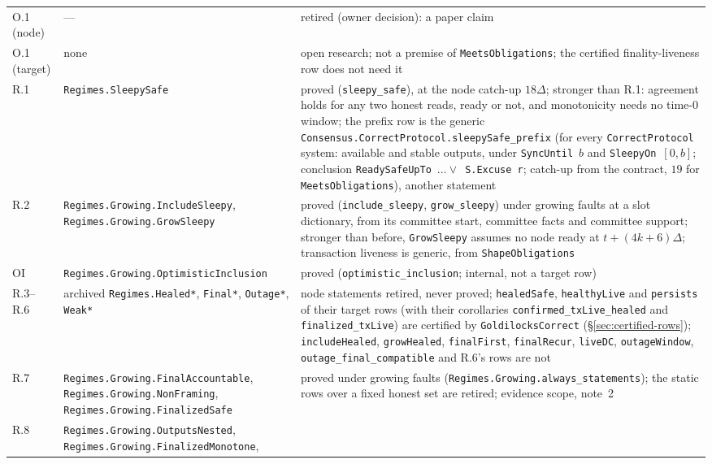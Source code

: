 \documentclass{article}
\begin{document}
{\begin{longtable}{@{}>{\raggedright\arraybackslash}p{1.6cm}>{\raggedright\arraybackslash}p{6.2cm}>{\raggedright\arraybackslash}p{5.2cm}@{}}
O.1 (node) & --- & retired (owner decision): a paper claim\\
O.1 (target) & none & open research; not a premise of \texttt{MeetsObligations};
  the certified finality-liveness row does not need it\\
R.1 & \texttt{Regimes.SleepySafe} & proved (\texttt{sleepy\_safe}), at
  the node catch-up $18\Delta$; stronger than R.1: agreement holds for any
  two honest reads, ready or not, and monotonicity needs no time-$0$ window; the prefix row is the generic
  \texttt{Consensus.CorrectProtocol.\allowbreak sleepySafe\_prefix} (for every \texttt{CorrectProtocol}
  system: available and stable outputs, under \texttt{SyncUntil}~$b$ and
  \texttt{SleepyOn}~$[0,b]$; conclusion
  \texttt{ReadySafeUpTo}~$\ldots\lor$~\texttt{S.Excuse r}; catch-up from the
  contract, $19$ for \texttt{MeetsObligations}),
  another statement\\
R.2 & \texttt{Regimes.Growing.IncludeSleepy}, \texttt{Regimes.Growing.GrowSleepy} & proved
  (\texttt{include\_sleepy}, \texttt{grow\_sleepy}) under growing faults at a slot
  dictionary, from its committee start, committee facts and committee support; stronger than before,
  \texttt{GrowSleepy} assumes no node ready at $t+(4k+6)\Delta$; transaction
  liveness is generic, from
  \texttt{ShapeObligations}\\
OI & \texttt{Regimes.Growing.OptimisticInclusion} & proved
  (\texttt{optimistic\_inclusion}; internal, not a target row)\\
R.3--R.6 & archived \texttt{Regimes.Healed*}, \texttt{Final*},
  \texttt{Outage*}, \texttt{Weak*} & node statements retired, never
  proved; \texttt{healedSafe}, \texttt{healthyLive} and \texttt{persists}
  of their target rows (with their corollaries \texttt{confirmed\_txLive\_healed}
  and \texttt{finalized\_txLive}) are certified by \texttt{GoldilocksCorrect}
  (\S\ref{sec:certified-rows}); \texttt{includeHealed}, \texttt{growHealed},
  \texttt{finalFirst}, \texttt{finalRecur}, \texttt{liveDC},
  \texttt{outageWindow}, \texttt{outage\_final\_compatible} and R.6's rows
  are not\\
R.7 & \texttt{Regimes.Growing.FinalAccountable},
  \texttt{Regimes.Growing.NonFraming}, \texttt{Regimes.Growing.FinalizedSafe}
  & proved under growing faults (\texttt{Regimes.Growing.always\_statements});
  the static rows over a fixed honest set are retired; evidence scope,
  note~2\\
R.8 & \texttt{Regimes.Growing.OutputsNested},
  \texttt{Regimes.Growing.FinalizedMonotone},

\end{longtable}}
\end{document}
